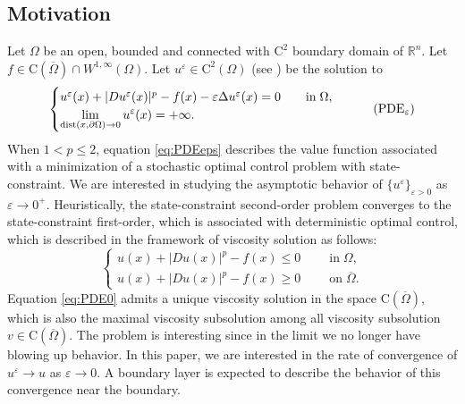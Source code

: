 \documentclass[11pt,reqno]{amsart}
\numberwithin{figure}{section}
\theoremstyle{plain}
\theoremstyle{remark}
\numberwithin{equation}{section}
\newcommand{\rmC}{\mathrm{C}}
\begin{document}
\subsection{Motivation} Let $\Omega$ be an open, bounded and connected with $\mathrm{C}^2$ boundary domain of $\mathbb{R}^n$. %
Let $f\in \mathrm{C}(\overline{\Omega})\cap W^{1,\infty}(\Omega)$. Let $u^\varepsilon\in \mathrm{C}^2(\Omega)$ (see \cite{Lasry1989}) be the solution to 
\begin{equation}\label{eq:PDEeps}
    \begin{cases}
      u^\varepsilon(x) + |Du^\varepsilon(x)|^p - f(x) - \varepsilon \Delta u^\varepsilon(x) = 0 \qquad
    \text{in}\;\Omega, \vspace{0cm}\\
    \displaystyle  \lim_{\mathrm{dist}(x,\partial \Omega)\to 0} u^\varepsilon(x) = +\infty.
    \end{cases} \tag{PDE$_\varepsilon$}
\end{equation}
When $1<p\leq 2$, equation \eqref{eq:PDEeps} describes the value function associated with a minimization of a stochastic optimal control problem with state-constraint. We are interested in studying the asymptotic behavior of $\{u^\varepsilon\}_{\varepsilon>0}$ as $\varepsilon\rightarrow 0^+$. Heuristically, the state-constraint second-order problem converges to the state-constraint first-order, which is associated with deterministic optimal control, which is described in the framework of viscosity solution as follows:
\begin{equation}\label{eq:PDE0}
    \begin{cases}
       u(x) + |Du(x)|^p - f(x) \leq 0\;\qquad\text{in}\;\Omega,\\
       u(x) + |Du(x)|^p - f(x) \geq 0\;\qquad\text{on}\;\overline{\Omega}.
    \end{cases} \tag{PDE$_0$}
\end{equation}
Equation \eqref{eq:PDE0} admits a unique viscosity solution in the space $\rmC(\overline{\Omega})$, which is also the maximal viscosity subsolution among all viscosity subsolution $v\in\rmC(\overline{\Omega})$. The problem is interesting since in the limit we no longer have blowing up behavior. In this paper, we are interested in the rate of convergence of $u^\varepsilon \to u$ as $\varepsilon\to 0$. A boundary layer is expected to describe the behavior of this convergence near the boundary.
\end{document}
